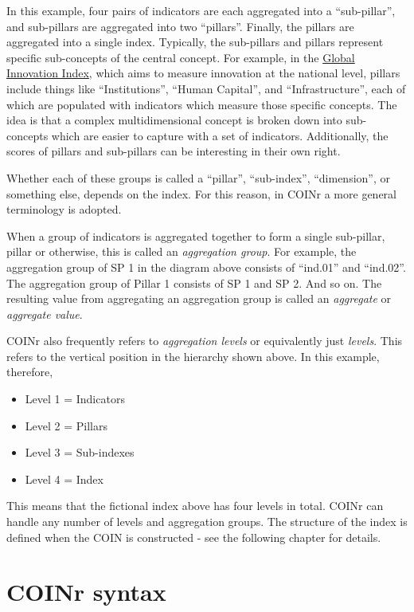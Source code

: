 \documentclass[
]{book}
\providecommand{\tightlist}{%
  \setlength{\itemsep}{0pt}\setlength{\parskip}{0pt}}
\begin{document}
In this example, four pairs of indicators are each aggregated into a ``sub-pillar'', and sub-pillars are aggregated into two ``pillars''. Finally, the pillars are aggregated into a single index. Typically, the sub-pillars and pillars represent specific sub-concepts of the central concept. For example, in the \href{https://www.globalinnovationindex.org/Home}{Global Innovation Index}, which aims to measure innovation at the national level, pillars include things like ``Institutions'', ``Human Capital'', and ``Infrastructure'', each of which are populated with indicators which measure those specific concepts. The idea is that a complex multidimensional concept is broken down into sub-concepts which are easier to capture with a set of indicators. Additionally, the scores of pillars and sub-pillars can be interesting in their own right.

Whether each of these groups is called a ``pillar'', ``sub-index'', ``dimension'', or something else, depends on the index. For this reason, in COINr a more general terminology is adopted.

When a group of indicators is aggregated together to form a single sub-pillar, pillar or otherwise, this is called an \emph{aggregation group}. For example, the aggregation group of SP 1 in the diagram above consists of ``ind.01'' and ``ind.02''. The aggregation group of Pillar 1 consists of SP 1 and SP 2. And so on. The resulting value from aggregating an aggregation group is called an \emph{aggregate} or \emph{aggregate value}.

COINr also frequently refers to \emph{aggregation levels} or equivalently just \emph{levels}. This refers to the vertical position in the hierarchy shown above. In this example, therefore,

\begin{itemize}
\tightlist
\item
  Level 1 = Indicators
\item
  Level 2 = Pillars
\item
  Level 3 = Sub-indexes
\item
  Level 4 = Index
\end{itemize}

This means that the fictional index above has four levels in total. COINr can handle any number of levels and aggregation groups. The structure of the index is defined when the COIN is constructed - see the following chapter for details.

\hypertarget{coinr-syntax}{%
\section{COINr syntax}\label{coinr-syntax}}
\end{document}
